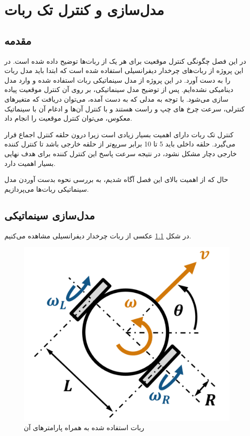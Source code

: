 \chapter{مدل‌سازی و کنترل تک ربات‌}
\section{مقدمه}
در این فصل چگونگی کنترل موقعیت برای هر یک از ربات‌ها توضیح داده شده است. در این پروژه از ربات‌های چرخدار دیفرانسیلی  استفاده شده است که ابتدا باید مدل ربات را به دست آورد. در این پروژه از مدل سینماتیکی  ربات استفاده شده و وارد مدل دینامیکی نشده‌ایم. پس از توضیح مدل سینماتیکی، بر روی آن کنترل موقعیت پیاده سازی می‌شود. با توجه به مدلی که به دست آمده، می‌توان دریافت که متغیرهای کنترلی، سرعت چرخ های چپ و راست هستند و با کنترل آن‌ها و ادغام آن با سینماتیک معکوس، می‌توان کنترل موقعیت را انجام داد.

کنترل تک ربات دارای اهمیت بسیار زیادی است زیرا درون حلقه کنترل اجماع قرار می‌گیرد. حلقه داخلی باید 5 تا 10 برابر سریع‌تر از حلقه خارجی باشد تا کنترل کننده خارجی دچار مشکل نشود، در نتیجه سرعت پاسخ این کنترل کننده برای هدف نهایی بسیار اهمیت دارد.

حال که از اهمیت بالای این فصل آگاه شدیم، به بررسی نحوه بدست آوردن مدل سینماتیکی ربات‌ها می‌پردازیم.
 
\section{مدل‌سازی سینماتیکی}

در شکل \ref{Fig differential-robot} عکسی از ربات چرخدار دیفرانسیلی مشاهده می‌کنیم. 
\begin{figure}[!h]
	\centering
	\includegraphics[scale=0.4]{Images/differential-robot-matlab.png}
	\caption{ربات استفاده شده به همراه پارامترهای آن}\label{Fig differential-robot}
\end{figure}

